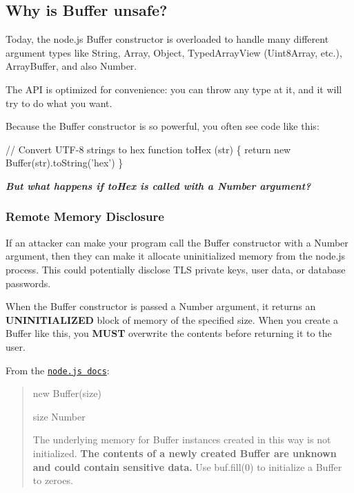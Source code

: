 \subsection*{Why is {\ttfamily Buffer} unsafe?}

Today, the node.\+js {\ttfamily Buffer} constructor is overloaded to handle many different argument types like {\ttfamily String}, {\ttfamily Array}, {\ttfamily Object}, {\ttfamily Typed\+Array\+View} ({\ttfamily Uint8\+Array}, etc.), {\ttfamily Array\+Buffer}, and also {\ttfamily Number}.

The A\+PI is optimized for convenience\+: you can throw any type at it, and it will try to do what you want.

Because the Buffer constructor is so powerful, you often see code like this\+:


\begin{DoxyCode}
// Convert UTF-8 strings to hex
function toHex (str) \{
  return new Buffer(str).toString('hex')
\}
\end{DoxyCode}


{\itshape {\bfseries But what happens if {\ttfamily to\+Hex} is called with a {\ttfamily Number} argument?}}

\subsubsection*{Remote Memory Disclosure}

If an attacker can make your program call the {\ttfamily Buffer} constructor with a {\ttfamily Number} argument, then they can make it allocate uninitialized memory from the node.\+js process. This could potentially disclose T\+LS private keys, user data, or database passwords.

When the {\ttfamily Buffer} constructor is passed a {\ttfamily Number} argument, it returns an {\bfseries U\+N\+I\+N\+I\+T\+I\+A\+L\+I\+Z\+ED} block of memory of the specified {\ttfamily size}. When you create a {\ttfamily Buffer} like this, you {\bfseries M\+U\+ST} overwrite the contents before returning it to the user.

From the \href{https://nodejs.org/api/buffer.html#buffer_new_buffer_size}{\tt node.\+js docs}\+:

\begin{quote}
{\ttfamily new Buffer(size)}


\begin{DoxyItemize}
\item {\ttfamily size} Number
\end{DoxyItemize}

The underlying memory for {\ttfamily Buffer} instances created in this way is not initialized. {\bfseries The contents of a newly created {\ttfamily Buffer} are unknown and could contain sensitive data.} Use {\ttfamily buf.\+fill(0)} to initialize a Buffer to zeroes. \end{quote}


